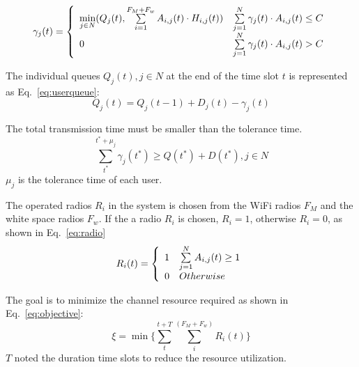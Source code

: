 \begin{equation}
\label{eq:effectiverate}
 \gamma_j(t) = \left\{ 
	  \begin{array}{l l}
	     \min\limits_{j\in N}(Q_j(t),\sum\limits_{i=1}^{F_M+F_w} A_{i,j}(t) \cdot H_{i,j}(t))   &  \sum\limits_{j=1}^N \gamma_j(t) \cdot A_{i,j}(t) \le C\\
		0 &  \sum\limits_{j=1}^N \gamma_j(t) \cdot A_{i,j}(t) > C
			    \end{array} \right.
\end{equation}


The individual queues $Q_j(t),j\in N$ at the end of the time slot $t$ is represented as Eq.~\ref{eq:userqueue}:
\begin{equation}
\label{eq:userqueue}
Q_j(t) = Q_j(t-1)+D_j(t)- \gamma_j(t)
\end{equation}


The total transmission time must be smaller than the tolerance time. 
\begin{equation}
\label{eq:timelimit}
\sum\limits_{t^*}^{t^*+\mu_j}\gamma_j(t^*) \ge Q(t^*)+D(t^*), j\in N
\end{equation}
$\mu_j$ is the tolerance time of each user.

The operated radios $R_i$ in the system is chosen from the WiFi radios $F_M$ and the white space radios $F_w$. 
If the a radio $R_i$ is chosen, $R_i = 1$, otherwise $R_i = 0$, as shown in Eq.~\ref{eq:radio}
\begin{equation}
\label{eq:radio}
 R_i(t) = \left\{ 
	  \begin{array}{l l}
	    1   &  \sum\limits_{j=1}^N A_{i,j}(t) \ge 1\\
		0 &  Otherwise
			    \end{array} \right.
\end{equation}


The goal is to minimize the channel resource required as shown in Eq.~\ref{eq:objective}:
\begin{equation}
\label{eq:objective}
\xi = \min{\{\sum\limits_{t}^{t+T}\sum\limits_{i}^{(F_M+F_w)} R_{i}}(t)\}
\end{equation}
$T$ noted the duration time slots to reduce the resource utilization.






